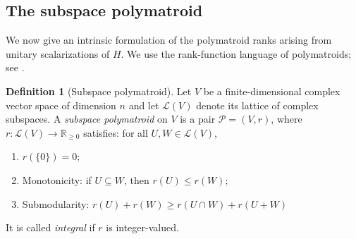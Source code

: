\documentclass[oneside,english,letterpaper]{amsart}
\numberwithin{equation}{section}
\theoremstyle{plain}
\theoremstyle{definition}
\newtheorem{defn}[thm]{Definition}
\theoremstyle{remark}
\begin{document}
\subsection{The subspace polymatroid}
\label{subsec:subspace-polymatroid}
We now give an intrinsic formulation of the polymatroid ranks arising
from unitary scalarizations of \(H\). We use the rank-function
language of polymatroids; see
\cite{MR270945,MR2171629,MR1956924,MR1956925,MR1956926}.
\begin{defn}[Subspace polymatroid]
\label{def:abstract-subspace-polymatroid}
Let \(V\) be a finite-dimensional complex vector space of dimension $n$ and let
\(\mathcal L(V)\) denote its lattice of complex subspaces. A
\emph{subspace polymatroid} on \(V\) is a pair
\(\mathcal P=(V,r)\), where
\(r\colon\mathcal L(V)\to\mathbb R_{\geq 0}\) satisfies: for all \(U,W\in\mathcal L(V)\),
\begin{enumerate}
    \item \(r(\{0\})=0\);
    \item {Monotonicity:} if \(U\subseteq W\), then \(r(U)\leq r(W)\);
    \item {Submodularity:}
    $
    r(U)+r(W)\geq r(U\cap W)+r(U+W)$
\end{enumerate}
It is called \emph{integral} if \(r\) is integer-valued.
\end{defn}
\end{document}

